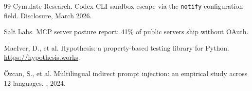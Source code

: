 \begin{thebibliography}{99}
Cymulate Research.
\newblock Codex CLI sandbox escape via the
\texttt{notify} configuration field. Disclosure, March 2026.

Salt Labs.
 MCP server posture report: 41\% of public servers
ship without OAuth.

MacIver, D., et al.
\newblock Hypothesis: a property-based testing library for Python.
\newblock \url{https://hypothesis.works}.

\"Ozcan, S., et al.
\newblock Multilingual indirect prompt injection: an empirical
study across 12 languages.
, 2024.

\end{thebibliography}


